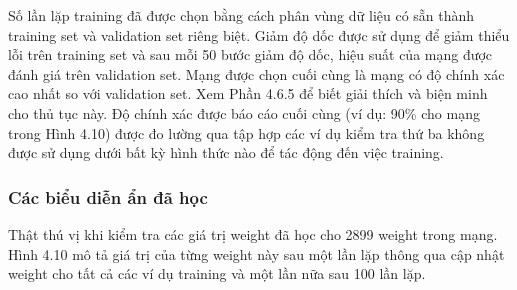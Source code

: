 Số lần lặp training đã được chọn bằng cách phân vùng dữ liệu có sẵn thành training set và validation set riêng biệt. Giảm độ dốc được sử dụng để giảm thiểu lỗi trên training set và sau mỗi 50 bước giảm độ dốc, hiệu suất của mạng được đánh giá trên validation set. Mạng được chọn cuối cùng là mạng có độ chính xác cao nhất so với validation set. Xem Phần 4.6.5 để biết giải thích và biện minh cho thủ tục này. Độ chính xác được báo cáo cuối cùng (ví dụ: 90\% cho mạng trong Hình 4.10) được đo lường qua tập hợp các ví dụ kiểm tra thứ ba không được sử dụng dưới bất kỳ hình thức nào để tác động đến việc training.

\subsubsection{Các biểu diễn ẩn đã học}

Thật thú vị khi kiểm tra các giá trị weight đã học cho 2899 weight trong mạng. Hình 4.10 mô tả giá trị của từng weight này sau một lần lặp thông qua cập nhật weight cho tất cả các ví dụ training và một lần nữa sau 100 lần lặp.


